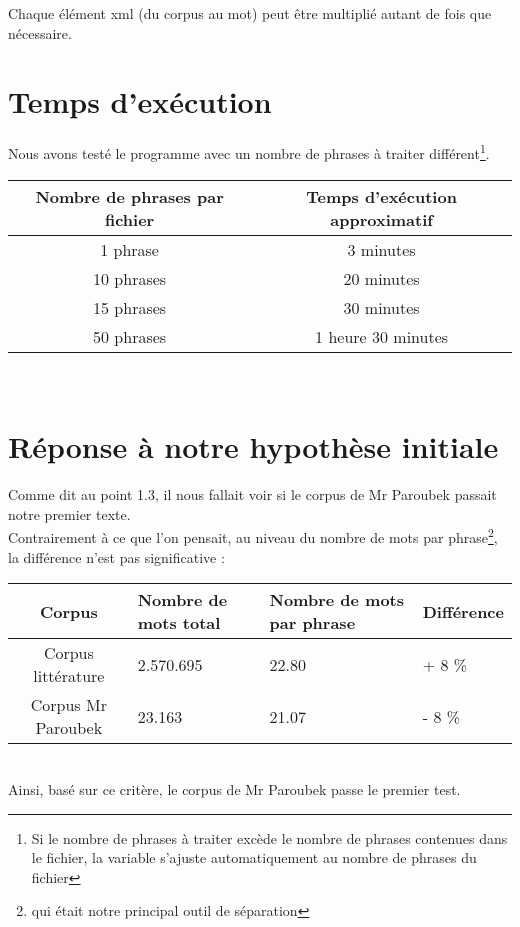 Chaque élément xml (du corpus au mot) peut être multiplié autant de fois que nécessaire. \\

\section{Temps d'exécution}

Nous avons testé le programme avec un nombre de phrases à traiter différent\footnote{Si le nombre de phrases à traiter excède le nombre de phrases contenues dans le fichier, la variable s'ajuste automatiquement au nombre de phrases du fichier}. \\

\begin{tabular}{|c|c|}
\hline
\textbf{Nombre de phrases par fichier} & \textbf{Temps d'exécution approximatif} \\ 
\hline \hline
1 phrase & 3 minutes \\
\hline
10 phrases & 20 minutes \\
\hline
15 phrases & 30 minutes \\
\hline
50 phrases & 1 heure 30 minutes \\
\hline
\end{tabular} 
~\\

\section{Réponse à notre hypothèse initiale}

Comme dit au point 1.3, il nous fallait voir si le corpus de Mr Paroubek passait notre premier texte. \\

Contrairement à ce que l'on pensait, au niveau du nombre de mots par phrase\footnote{qui était notre principal outil de séparation}, la différence n'est pas significative : \\

\begin{tabular}{|c|P{3cm}|P{4cm}|P{3cm}|}
\hline
\textbf{Corpus} & \textbf{Nombre de mots total} & \textbf{Nombre de mots par phrase} & \textbf{Différence} \\ 
\hline \hline
Corpus littérature & 2.570.695 & 22.80 & + 8 \% \\
\hline
Corpus Mr Paroubek & 23.163 & 21.07 & - 8 \% \\
\hline
\end{tabular} 
~\\

Ainsi, basé sur ce critère, le corpus de Mr Paroubek passe le premier test. \\
